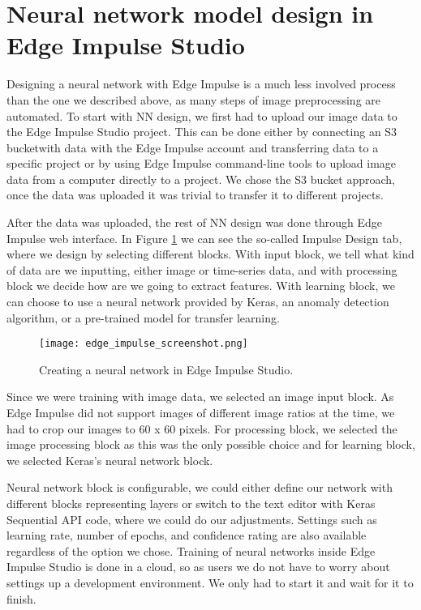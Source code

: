 \section{ Neural network model design in Edge Impulse Studio}

Designing a neural network with Edge Impulse is a much less involved process than the one we described above, as many steps of image preprocessing are automated.
To start with NN design, we first had to upload our image data to the Edge Impulse Studio project.
This can be done either by connecting an S3 bucket\footnotemark with data with the Edge Impulse account and transferring data to a specific project or by using Edge Impulse command-line tools to upload image data from a computer directly to a project.
We chose the S3 bucket approach, once the data was uploaded it was trivial to transfer it to different projects.


After the data was uploaded, the rest of NN design was done through Edge Impulse web interface.
In Figure \ref{edge_impulse_screenshot} we can see the so-called Impulse Design tab, where we design by selecting different blocks.
With input block, we tell what kind of data are we inputting, either image or time-series data, and with processing block we decide how are we going to extract features.
With learning block, we can choose to use a neural network provided by Keras, an anomaly detection algorithm, or a pre-trained model for transfer learning.

\begin{figure}[ht]
    \centering
    \texttt{[image: edge\_impulse\_screenshot.png]} 
    \caption{Creating a neural network in Edge Impulse Studio.}
    \label{edge_impulse_screenshot}
\end{figure}

Since we were training with image data, we selected an image input block. As Edge Impulse did not support images of different image ratios at the time, we had to crop our images to 60 x 60 pixels.
For processing block, we selected the image processing block as this was the only possible choice and for learning block, we selected Keras's neural network block.

Neural network block is configurable, we could either define our network with different blocks representing layers or switch to the text editor with Keras Sequential API code, where we could do our adjustments.
Settings such as learning rate, number of epochs, and confidence rating are also available regardless of the option we chose.
Training of neural networks inside Edge Impulse Studio is done in a cloud, so as users we do not have to worry about settings up a development environment.
We only had to start it and wait for it to finish.


